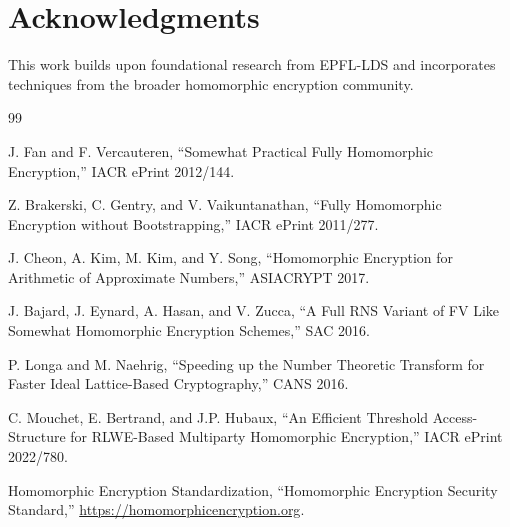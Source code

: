 \documentclass[11pt,a4paper]{article}
\theoremstyle{definition}
\begin{document}
\section*{Acknowledgments}

This work builds upon foundational research from EPFL-LDS and incorporates techniques from the broader homomorphic encryption community.


\begin{thebibliography}{99}

J. Fan and F. Vercauteren, ``Somewhat Practical Fully Homomorphic Encryption,'' IACR ePrint 2012/144.

Z. Brakerski, C. Gentry, and V. Vaikuntanathan, ``Fully Homomorphic Encryption without Bootstrapping,'' IACR ePrint 2011/277.

J. Cheon, A. Kim, M. Kim, and Y. Song, ``Homomorphic Encryption for Arithmetic of Approximate Numbers,'' ASIACRYPT 2017.

J. Bajard, J. Eynard, A. Hasan, and V. Zucca, ``A Full RNS Variant of FV Like Somewhat Homomorphic Encryption Schemes,'' SAC 2016.

P. Longa and M. Naehrig, ``Speeding up the Number Theoretic Transform for Faster Ideal Lattice-Based Cryptography,'' CANS 2016.

C. Mouchet, E. Bertrand, and J.P. Hubaux, ``An Efficient Threshold Access-Structure for RLWE-Based Multiparty Homomorphic Encryption,'' IACR ePrint 2022/780.

Homomorphic Encryption Standardization, ``Homomorphic Encryption Security Standard,'' \url{https://homomorphicencryption.org}.

\end{thebibliography}
\end{document}
